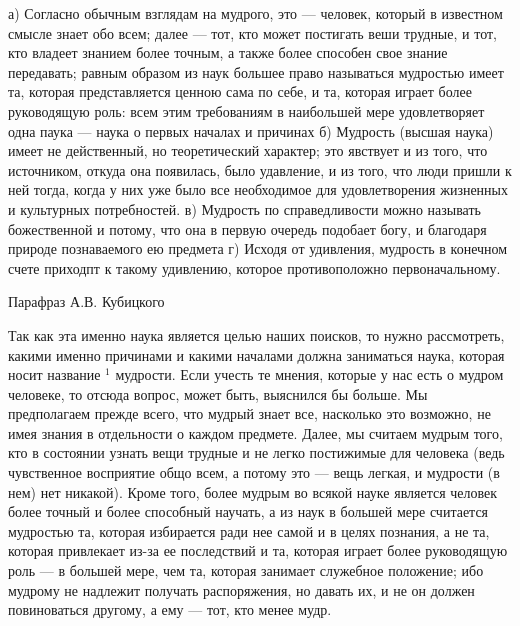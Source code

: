 \documentclass[oneside, 17pt, dvipsnames]{extbook}
\newcommand{\alignedmarginpar}[1]{
  \leavevmode
  \marginpar{\footnotesize #1}
  \ignorespaces
}
\begin{document}
\epigraph{
а) Согласно обычным взглядам на мудрого, это --- человек, который в известном смысле знает обо всем; далее --- тот, кто может постигать веши трудные, и тот, кто владеет знанием более точным, а также более способен свое знание передавать; равным образом из наук большее право называться мудростью имеет та, которая представляется ценною сама по себе, и та, которая играет более руководящую роль: всем этим требованиям в наибольшей мере удовлетворяет одна паука --- наука о первых началах и причинах
б) Мудрость (высшая наука) имеет не действенный, но теоретический характер; это явствует и из того, что источником, откуда она появилась, было удавление, и из того, что люди пришли к ней тогда, когда у них уже было все необходимое для удовлетворения жизненных и культурных потребностей.
в) Мудрость по справедливости можно называть божественной и потому, что она в первую очередь подобает богу, и благодаря природе познаваемого ею предмета
г) Исходя от удивления, мудрость в конечном счете приходпт к такому удивлению, которое противоположно первоначальному.
}{Парафраз А.В. Кубицкого}

\alignedmarginpar{$^1$ см. 981 Ь 28—«так называемая мудрость».}
Так как эта именно наука является целью наших поисков, то нужно рассмотреть, какими именно причинами и какими началами должна заниматься наука, которая носит название $^1$ мудрости. Если учесть те мнения, которые у нас есть о мудром человеке, то отсюда вопрос, может быть, выяснился бы больше. Мы предполагаем прежде всего, что мудрый знает все, насколько это возможно, не имея знания в отдельности о каждом предмете. Далее, мы считаем мудрым того, кто в состоянии узнать вещи трудные и не легко постижимые для человека (ведь чувственное восприятие общо всем, а потому это — вещь легкая, и мудрости (в нем) нет никакой). Кроме того, более мудрым во всякой науке является человек более точный и более способный научать, а из наук в большей мере считается мудростью та, которая избирается ради нее самой и в целях познания, а не та, которая привлекает из-за ее последствий и та, которая играет более руководящую роль — в большей мере, чем та, которая занимает служебное положение; ибо мудрому не надлежит получать распоряжения, но давать их, и не он должен повиноваться другому, а ему — тот, кто менее мудр.
\end{document}
